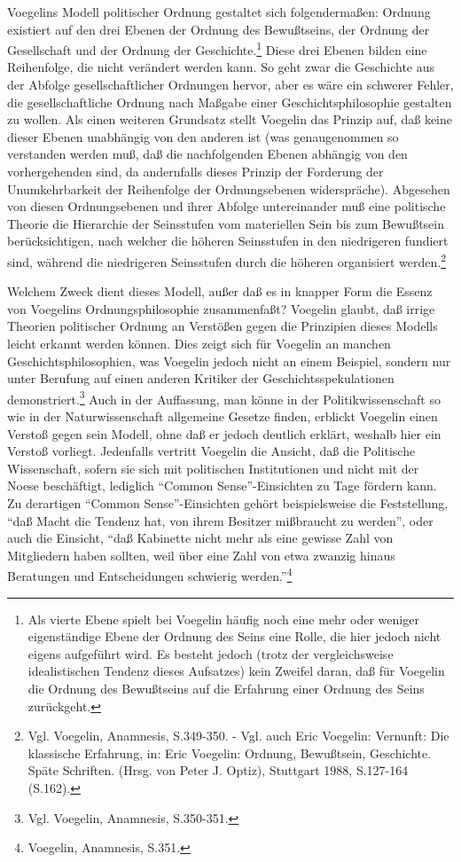 Voegelins Modell politischer Ordnung gestaltet sich folgendermaßen: Ordnung
existiert auf den drei Ebenen der Ordnung des Bewußtseins, der Ordnung der
Gesellschaft und der Ordnung der Geschichte.\footnote{Als vierte Ebene spielt
  bei Voegelin häufig noch eine mehr oder weniger eigenständige Ebene der
  Ordnung des Seins eine Rolle, die hier jedoch nicht eigens aufgeführt wird.
  Es besteht jedoch (trotz der vergleichsweise idealistischen Tendenz dieses
  Aufsatzes) kein Zweifel daran, daß für Voegelin die Ordnung des Bewußtseins
  auf die Erfahrung einer Ordnung des Seins zurückgeht.} Diese drei Ebenen
bilden eine Reihenfolge, die nicht verändert werden kann. So geht zwar die
Geschichte aus der Abfolge gesellschaftlicher Ordnungen hervor, aber es wäre
ein schwerer Fehler, die gesellschaftliche Ordnung nach Maßgabe einer
Geschichtsphilosophie gestalten zu wollen. Als einen weiteren Grundsatz stellt
Voegelin das Prinzip auf, daß keine dieser Ebenen unabhängig von den anderen
ist (was genaugenommen so verstanden werden muß, daß die nachfolgenden Ebenen
abhängig von den vorhergehenden sind, da andernfalls dieses Prinzip der
Forderung der Unumkehrbarkeit der Reihenfolge der Ordnungsebenen
widerspräche). Abgesehen von diesen Ordnungsebenen und ihrer Abfolge
untereinander muß eine politische Theorie die Hierarchie der Seinsstufen vom
materiellen Sein bis zum Bewußtsein berücksichtigen, nach welcher die höheren
Seinsstufen in den niedrigeren fundiert sind, während die niedrigeren
Seinsstufen durch die höheren organisiert werden.\footnote{Vgl. Voegelin,
  Anamnesis, S.349-350. - Vgl. auch Eric Voegelin: Vernunft: Die klassische
  Erfahrung, in: Eric Voegelin: Ordnung, Bewußtsein, Geschichte. Späte
  Schriften.  (Hrsg. von Peter J. Optiz), Stuttgart 1988, S.127-164 (S.162).}

Welchem Zweck dient dieses Modell, außer daß es in knapper Form die Essenz von
Voegelins Ordnungsphilosophie zusammenfaßt? Voegelin glaubt, daß irrige
Theorien politischer Ordnung an Verstößen gegen die Prinzipien dieses Modells
leicht erkannt werden können. Dies zeigt sich für Voegelin an manchen
Geschichtsphilosophien, was Voegelin jedoch nicht an einem Beispiel, sondern
nur unter Berufung auf einen anderen Kritiker der Geschichtsspekulationen
demonstriert.\footnote{Vgl. Voegelin, Anamnesis, S.350-351.} Auch in der
Auffassung, man könne in der Politikwissenschaft so wie in der
Naturwissenschaft allgemeine Gesetze finden, erblickt Voegelin einen Verstoß
gegen sein Modell, ohne daß er jedoch deutlich erklärt, weshalb hier ein
Verstoß vorliegt. Jedenfalls vertritt Voegelin die Ansicht, daß die Politische
Wissenschaft, sofern sie sich mit politischen Institutionen
und nicht mit der Noese beschäftigt, lediglich "`Common Sense"'-Einsichten zu
Tage fördern kann. Zu derartigen "`Common Sense"'-Einsichten gehört
beispielsweise die Feststellung, "`daß Macht die Tendenz hat, von ihrem
Besitzer mißbraucht zu werden"', oder auch die Einsicht, "`daß Kabinette nicht
mehr als eine gewisse Zahl von Mitgliedern haben sollten, weil über eine Zahl
von etwa zwanzig hinaus Beratungen und Entscheidungen schwierig
werden."'\footnote{Voegelin, Anamnesis, S.351.} 

